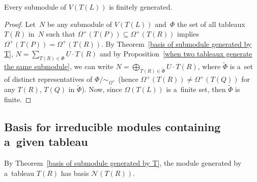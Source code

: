 \begin{Proposition}
Every submodule of $V(T(L))$ is finitely generated.
\end{Proposition}
\begin{proof}
Let~$N$ be any submodule of $V(T(L))$ and~$\Phi$ the set of all tableaux $T(R)$ in~$N$ such that
$\Omega^{+}(T(P))\subseteq\Omega^{+}(T(R))$ implies $\Omega^{+}(T(P))=\Omega^{+}(T(R))$.
By Theorem~\ref{basis of submodule generated by T}, $N=\sum\limits_{T(R)\in\Phi} U\cdot T(R)$ and by
Proposition~\ref{when two tableaux generate the same submodule}, we can write $N=\bigoplus_{T(R)\in\tilde{\Phi}} U\cdot
T(R)$, where $\tilde{\Phi}$ is a~set of distinct representatives of $\Phi/\sim_{\Omega^+}$ (hence
$\Omega^{+}(T(R))\neq\Omega^{+}(T(Q))$ for any $T(R)$, $T(Q)$ in $\tilde{\Phi}$).
Now, since $\Omega(T(L))$ is a~f\/inite set, then $\tilde{\Phi}$ is f\/inite.
\end{proof}

\subsection{Basis for irreducible modules containing a~given tableau}
By Theorem~\ref{basis of submodule generated by T}, the module generated by a~tableau $T(R)$ has basis
$\mathcal{N}(T(R))$.
